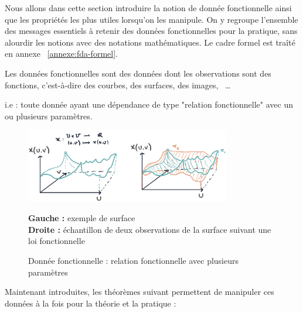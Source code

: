 
Nous allons dans cette section introduire la notion de donnée fonctionnelle ainsi que les propriétés les plus utiles lorsqu'on les manipule. On y regroupe l'ensemble des messages essentiels à retenir des données fonctionnelles pour la pratique, sans alourdir les notions avec des notations mathématiques. Le cadre formel est traîté en annexe ~\ref{annexe:fda-formel}.

\begin{definition*}
	Les données fonctionnelles sont des données dont les observations sont des fonctions, c'est-à-dire des courbes, des surfaces, des images, \, \dots

	i.e : toute donnée ayant une dépendance de type "relation fonctionnelle" avec un ou plusieurs paramètres.
	\label{def*:fda}
\end{definition*}

\begin{figure}[H]
	\begin{center}
		\includegraphics[width=0.8\textwidth]{Images/sketches/fda_surface.jpg}
	\end{center}

	{
	\textbf{Gauche :} exemple de surface
	\\
	\textbf{Droite :} échantillon de deux observations de la surface suivant une loi fonctionnelle}

	\caption{Donnée fonctionnelle : relation fonctionnelle avec plusieurs paramètres}
	\label{fig:sketch_surface}
\end{figure}

Maintenant introduites, les théorèmes suivant permettent de manipuler ces données à la fois pour la théorie et la pratique :

\begin{thm*}
	\noindent{}
	\label{thm*:KL}
\end{thm*}


